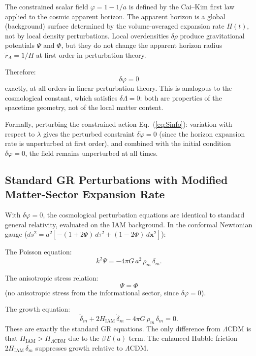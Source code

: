 \documentclass[11pt]{article}
\begin{document}
The constrained scalar field $\varphi = 1 - 1/a$ is defined by the Cai--Kim
first law applied to the cosmic apparent horizon.  The apparent horizon is a
global (background) surface determined by the volume-averaged expansion rate
$H(t)$, not by local density perturbations.  Local overdensities $\delta\rho$
produce gravitational potentials $\Psi$ and $\Phi$, but they do not change
the apparent horizon radius $\tilde{r}_A = 1/H$ at first order in
perturbation theory.

Therefore:
\begin{equation}
\delta\varphi = 0
\label{eq:dphi_zero}
\end{equation}
exactly, at all orders in linear perturbation theory.  This is analogous to
the cosmological constant, which satisfies $\delta\Lambda = 0$: both are
properties of the spacetime geometry, not of the local matter content.

Formally, perturbing the constrained action Eq.~(\ref{eq:Sinfo}): variation
with respect to $\lambda$ gives the perturbed constraint
$\delta\dot{\varphi} = 0$ (since the horizon expansion rate is unperturbed
at first order), and combined with the initial condition $\delta\varphi = 0$,
the field remains unperturbed at all times.

\subsection{Standard GR Perturbations with Modified Matter-Sector Expansion Rate}

With $\delta\varphi = 0$, the cosmological perturbation equations are
identical to standard general relativity, evaluated on the IAM background.
In the conformal Newtonian gauge
($ds^2 = a^2[-(1+2\Psi)\,d\tau^2 + (1-2\Phi)\,d\mathbf{x}^2]$):

The Poisson equation:
\begin{equation}
k^2\Psi = -4\pi G\,a^2\,\rho_m\,\delta_m.
\end{equation}

The anisotropic stress relation:
\begin{equation}
\Psi = \Phi
\end{equation}
(no anisotropic stress from the informational sector, since
$\delta\varphi = 0$).

The growth equation:
\begin{equation}
\ddot{\delta}_m + 2H_\mathrm{IAM}\,\dot{\delta}_m
- 4\pi G\,\rho_m\,\delta_m = 0.
\label{eq:growth_IAM}
\end{equation}
These are exactly the standard GR equations.  The only difference from
$\Lambda$CDM is that $H_\mathrm{IAM} > H_{\Lambda\mathrm{CDM}}$ due to the
$\beta\,\mathcal{E}(a)$ term.  The enhanced Hubble friction
$2H_\mathrm{IAM}\,\dot{\delta}_m$ suppresses growth relative to $\Lambda$CDM.
\end{document}
